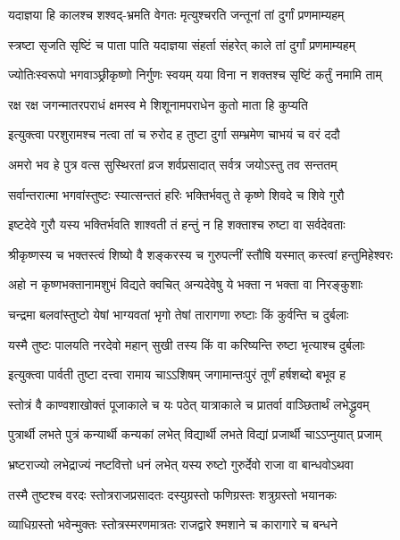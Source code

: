 \twolineshloka
{यदाज्ञया हि कालश्च शश्वद्-भ्रमति वेगतः}
{मृत्युश्चरति जन्तूनां तां दुर्गां प्रणमाम्यहम्}

\twolineshloka
{स्त्रष्टा सृजति सृष्टिं च पाता पाति यदाज्ञया}
{संहर्ता संहरेत् काले तां दुर्गां प्रणमाम्यहम्}

\twolineshloka
{ज्योतिःस्वरूपो भगवाञ्छ्रीकृष्णो निर्गुणः स्वयम्}
{यया विना न शक्तश्च सृष्टिं कर्तुं नमामि ताम्}

\twolineshloka
{रक्ष रक्ष जगन्मातरपराधं क्षमस्व मे}
{शिशूनामपराधेन कुतो माता हि कुप्यति}

\twolineshloka
{इत्युक्त्वा परशुरामश्च नत्वा तां च रुरोद ह}
{तुष्टा दुर्गा सम्भ्रमेण चाभयं च वरं ददौ}

\twolineshloka
{अमरो भव हे पुत्र वत्स सुस्थिरतां व्रज}
{शर्वप्रसादात् सर्वत्र जयोऽस्तु तव सन्ततम्}


\twolineshloka
{सर्वान्तरात्मा भगवांस्तुष्टः स्यात्सन्ततं हरिः}
{भक्तिर्भवतु ते कृष्णे शिवदे च शिवे गुरौ}

\twolineshloka
{इष्टदेवे गुरौ यस्य भक्तिर्भवति शाश्वती}
{तं हन्तुं न हि शक्ताश्च रुष्टा वा सर्वदेवताः}

\twolineshloka
{श्रीकृष्णस्य च भक्तस्त्वं शिष्यो वै शङ्करस्य च}
{गुरुपत्‍‌नीं स्तौषि यस्मात् कस्त्वां हन्तुमिहेश्वरः}

\twolineshloka
{अहो न कृष्णभक्तानामशुभं विद्यते क्वचित्}
{अन्यदेवेषु ये भक्ता न भक्ता वा निरङ्कुशाः}

\twolineshloka
{चन्द्रमा बलवांस्तुष्टो येषां भाग्यवतां भृगो}
{तेषां तारागणा रुष्टाः किं कुर्वन्ति च दुर्बलाः}

\twolineshloka
{यस्मै तुष्टः पालयति नरदेवो महान् सुखी}
{तस्य किं वा करिष्यन्ति रुष्टा भृत्याश्च दुर्बलाः}

\twolineshloka
{इत्युक्त्वा पार्वती तुष्टा दत्त्‍‌वा रामाय चाऽऽशिषम्}
{जगामान्तःपुरं तूर्णं हर्षशब्दो बभूव ह}


\twolineshloka
{स्तोत्रं वै काण्वशाखोक्तं पूजाकाले च यः पठेत्}
{यात्राकाले च प्रातर्वा वाञ्छितार्थं लभेद्ध्रुवम्}

\twolineshloka
{पुत्रार्थी लभते पुत्रं कन्यार्थी कन्यकां लभेत्}
{विद्यार्थी लभते विद्यां प्रजार्थी चाऽऽप्नुयात् प्रजाम्}

\twolineshloka
{भ्रष्टराज्यो लभेद्राज्यं नष्टवित्तो धनं लभेत्}
{यस्य रुष्टो गुरुर्देवो राजा वा बान्धवोऽथवा}

\twolineshloka
{तस्मै तुष्टश्च वरदः स्तोत्रराजप्रसादतः}
{दस्युग्रस्तो फणिग्रस्तः शत्रुग्रस्तो भयानकः}

\twolineshloka
{व्याधिग्रस्तो भवेन्मुक्तः स्तोत्रस्मरणमात्रतः}
{राजद्वारे श्मशाने च कारागारे च बन्धने}

